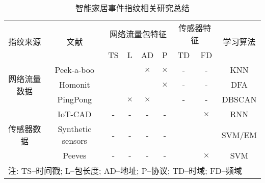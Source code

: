 \begin{table}[h]
	\caption{智能家居事件指纹相关研究总结}
	\label{tab:event_fin_refs}
	\centering
	\begin{tabular}{ccccccccc}
		\toprule
		\multirow{2}{*}{指纹来源}  & \multirow{2}{*}{文献} &  \multicolumn{4}{c}{网络流量包特征}   &  \multicolumn{2}{c}{传感器特征}     & \multirow{2}{*}{学习算法} \\ 
		\cline{3-8}
		&                             &    \multicolumn{1}{c}{TS}     &     \multicolumn{1}{c}{L}     &    \multicolumn{1}{c}{AD}     &     P     &    \multicolumn{1}{c}{TD}     &    FD     &                                     \\ 
		\midrule
		\multirow{3}{*}{网络流量数据} &  Peek-a-boo & \multicolumn{1}{c}{\checkmark} & \multicolumn{1}{c}{\checkmark}  & \multicolumn{1}{c}{$\times$}  & $\times$  &     \multicolumn{1}{c}{-}     &     -     &                 KNN                 \\
		&           Homonit            & \multicolumn{1}{c}{\checkmark} & \multicolumn{1}{c}{\checkmark} & \multicolumn{1}{c}{\checkmark} & $\times$  &     \multicolumn{1}{c}{-}     &     -     &                 DFA                 \\
		&          PingPong           & \multicolumn{1}{c}{\checkmark} & \multicolumn{1}{c}{$\times$}  & \multicolumn{1}{c}{$\times$}  & \checkmark &     \multicolumn{1}{c}{-}     &     -     &               DBSCAN              \\
		\multirow{3}{*}{传感器数据}      &           IoT-CAD            &     \multicolumn{1}{c}{-}     &     \multicolumn{1}{c}{-}     &     \multicolumn{1}{c}{-}     &     -     & \multicolumn{1}{c}{\checkmark} & $\times$  &                 RNN                 \\
		&      Synthetic sensors       &     \multicolumn{1}{c}{-}     &     \multicolumn{1}{c}{-}     &     \multicolumn{1}{c}{-}     &     -     & \multicolumn{1}{c}{\checkmark} & \checkmark &               SVM/EM                \\
		&           Peeves             &     \multicolumn{1}{c}{-}     &     \multicolumn{1}{c}{-}     &     \multicolumn{1}{c}{-}     &     -     & \multicolumn{1}{c}{\checkmark} & $\times$  &                 SVM                 \\ 
		\hline
		\multicolumn{9}{l}{ \footnotesize 注: TS--时间戳; L--包长度; AD--地址; P--协议; TD--时域; FD--频域}\\		 
		\bottomrule
	\end{tabular}
\end{table}

